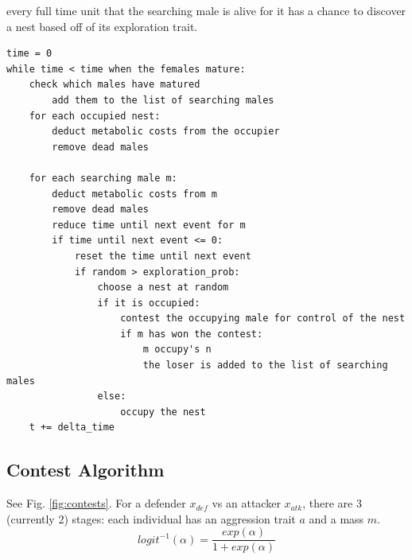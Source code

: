\documentclass[a4paper,11pt]{article}
\begin{document}
every full time unit that the searching male is alive for it has a chance to discover a nest based off of its exploration trait.

\begin{verbatim}
time = 0
while time < time when the females mature:
    check which males have matured
        add them to the list of searching males
    for each occupied nest:
        deduct metabolic costs from the occupier
        remove dead males

    for each searching male m:
        deduct metabolic costs from m
        remove dead males
        reduce time until next event for m
        if time until next event <= 0:
            reset the time until next event
            if random > exploration_prob:
                choose a nest at random
                if it is occupied:
                    contest the occupying male for control of the nest
                    if m has won the contest:
                        m occupy's n
                        the loser is added to the list of searching males
                else:
                    occupy the nest
    t += delta_time
\end{verbatim}

\clearpage
\subsection{Contest Algorithm}
See Fig. \ref{fig:contests}.
For a defender $x_{def}$ vs an attacker $x_{atk}$, there are 3 (currently 2) stages:
each individual has an aggression trait $a$ and a mass $m$.
\begin{equation}\label{eq:logit}
    logit^{-1}(\alpha) = \frac{exp(\alpha)}{1 + exp(\alpha)}
\end{equation}
\end{document}
